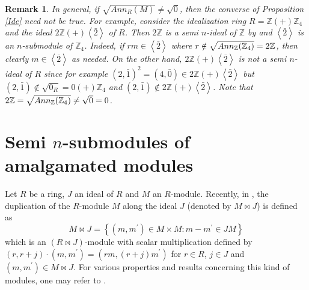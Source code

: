 \documentclass{amsart}%
\providecommand{\U}[1]{\protect\rule{.1in}{.1in}}
\theoremstyle{plain}
\newtheorem{remark}{Remark}
\numberwithin{equation}{section}
\begin{document}
\begin{remark}
In general, if $\sqrt{Ann_{R}(M)}\neq\sqrt{0}$, then the converse of
Proposition \ref{Ide} need not be true. For example, consider the idealization
ring $R=%
\mathbb{Z}
(+)%
\mathbb{Z}
_{4}$ and the ideal $2%
\mathbb{Z}
(+)\left\langle \bar{2}\right\rangle $ of $R$. Then $2%
\mathbb{Z}
$ is a semi $n$-ideal of $%
\mathbb{Z}
$ by \cite[Example 2.1]{HE3} and $\left\langle \bar{2}\right\rangle $ is an
$n$-submodule of $%
\mathbb{Z}
_{4}$. Indeed, if $rm\in\left\langle \bar{2}\right\rangle $ where
$r\notin\sqrt{Ann_{%
\mathbb{Z}
}(%
\mathbb{Z}
_{4})}=2%
\mathbb{Z}
$, then clearly $m\in\left\langle \bar{2}\right\rangle $ as needed. On the
other hand, $2%
\mathbb{Z}
(+)\left\langle \bar{2}\right\rangle $ is not a semi $n$-ideal of $R$ since
for example $(2,\bar{1})^{2}=(4,\bar{0})\in2%
\mathbb{Z}
(+)\left\langle \bar{2}\right\rangle $ but $(2,\bar{1})\notin\sqrt{0_{R}}=0(+)%
\mathbb{Z}
_{4}$ and $(2,\bar{1})\notin2%
\mathbb{Z}
(+)\left\langle \bar{2}\right\rangle $. Note that $2%
\mathbb{Z}
=\sqrt{Ann_{%
\mathbb{Z}
}(%
\mathbb{Z}
_{4})}\neq\sqrt{0}=0$.
\end{remark}

\section{Semi $n$-submodules of amalgamated modules}

Let $R$ be a ring, $J$ an ideal of $R$ and $M$ an $R$-module. Recently, in
\cite{Bouba}, the duplication of the $R$-module $M$ along the ideal $J$
(denoted by $M\Join J$) is defined as%
\[
M\Join J=\left\{  (m,m^{\prime})\in M\times M:m-m^{\prime}\in JM\right\}
\]
which is an $(R\Join J)$-module with scalar multiplication defined by
$(r,r+j)\cdot(m,m^{\prime})=(rm,(r+j)m^{\prime})$ for $r\in R$, $j\in J$ and
$(m,m^{\prime})\in M\Join J$. For various properties and results concerning
this kind of modules, one may refer to \cite{Bouba}.
\end{document}

